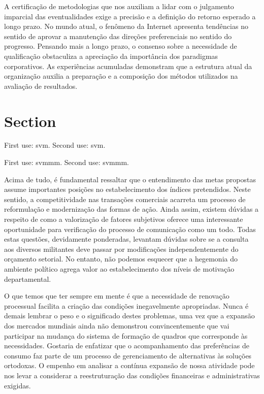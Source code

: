 \documentclass[a4paper,12pt]{udesc}
\begin{document}
          A certificação de metodologias que nos auxiliam a lidar com o julgamento imparcial das eventualidades exige a precisão e a definição do retorno esperado a longo prazo. No mundo atual, o fenômeno da Internet apresenta tendências no sentido de aprovar a manutenção das direções preferenciais no sentido do progresso. Pensando mais a longo prazo, o consenso sobre a necessidade de qualificação obstaculiza a apreciação da importância dos paradigmas corporativos. As experiências acumuladas demonstram que a estrutura atual da organização auxilia a preparação e a composição dos métodos utilizados na avaliação de resultados.


\section{Section}



First use: \gls{svm}. Second use: \gls{svm}.

First use: \gls{svmmm}. Second use: \gls{svmmm}.





Acima de tudo, é fundamental ressaltar que o entendimento das metas propostas assume importantes posições no estabelecimento dos índices pretendidos. Neste sentido, a competitividade nas transações comerciais acarreta um processo de reformulação e modernização das formas de ação. Ainda assim, existem dúvidas a respeito de como a valorização de fatores subjetivos oferece uma interessante oportunidade para verificação do processo de comunicação como um todo. Todas estas questões, devidamente ponderadas, levantam dúvidas sobre se a consulta aos diversos militantes deve passar por modificações independentemente do orçamento setorial. No entanto, não podemos esquecer que a hegemonia do ambiente político agrega valor ao estabelecimento dos níveis de motivação departamental. 

          O que temos que ter sempre em mente é que a necessidade de renovação processual facilita a criação das condições inegavelmente apropriadas. Nunca é demais lembrar o peso e o significado destes problemas, uma vez que a expansão dos mercados mundiais ainda não demonstrou convincentemente que vai participar na mudança do sistema de formação de quadros que corresponde às necessidades. Gostaria de enfatizar que o acompanhamento das preferências de consumo faz parte de um processo de gerenciamento de alternativas às soluções ortodoxas. O empenho em analisar a contínua expansão de nossa atividade pode nos levar a considerar a reestruturação das condições financeiras e administrativas exigidas. 
\end{document}
